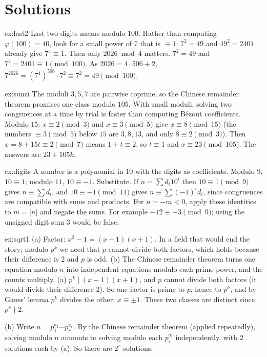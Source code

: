 \section{Solutions}

\begin{solution}{ex:last2}
\idea Last two digits means modulo $100$. Rather than computing $\varphi(100)=40$, look for a small power of $7$ that is $\equiv1$: $7^2=49$ and $49^2=2401$ already give $7^4\equiv1$. Then only $2026\bmod4$ matters.
\writeup $7^2=49$ and $7^4=2401\equiv1\pmod{100}$. As $2026=4\cdot506+2$, $7^{2026}=(7^4)^{506}\cdot7^2\equiv7^2=49\pmod{100}$.
\end{solution}

\begin{solution}{ex:sunzi}
\idea The moduli $3,5,7$ are pairwise coprime, so the Chinese remainder theorem promises one class modulo $105$. With small moduli, solving two congruences at a time by trial is faster than computing B\'ezout coefficients.
\writeup Modulo $15$: $x\equiv2\pmod3$ and $x\equiv3\pmod5$ give $x\equiv8\pmod{15}$ (the numbers $\equiv3\pmod5$ below $15$ are $3,8,13$, and only $8\equiv2\pmod3$). Then $x=8+15t\equiv2\pmod7$ means $1+t\equiv2$, so $t\equiv1$ and $x\equiv23\pmod{105}$. The answers are $23+105k$.
\end{solution}

\begin{solution}{ex:digits}
\idea A number is a polynomial in $10$ with the digits as coefficients. Modulo $9$, $10\equiv1$; modulo $11$, $10\equiv-1$. Substitute.
\writeup If $n=\sum d_i10^i$ then $10\equiv1\pmod9$ gives $n\equiv\sum d_i$, and $10\equiv-1\pmod{11}$ gives $n\equiv\sum(-1)^id_i$, since congruences are compatible with sums and products. For $n=-m<0$, apply these identities to $m=|n|$ and negate the sums. For example $-12\equiv-3\pmod9$; using the unsigned digit sum $3$ would be false.
\end{solution}

\begin{solution}{ex:sqrt1}
\idea (a) Factor: $x^2-1=(x-1)(x+1)$. In a field that would end the story; modulo $p^k$ we need that $p$ cannot divide both factors, which holds because their difference is $2$ and $p$ is odd. (b) The Chinese remainder theorem turns one equation modulo $n$ into independent equations modulo each prime power, and the counts multiply.
\writeup (a) $p^k\mid(x-1)(x+1)$, and $p$ cannot divide both factors (it would divide their difference $2$). So one factor is prime to $p$, hence to $p^k$, and by Gauss' lemma $p^k$ divides the other: $x\equiv\pm1$. These two classes are distinct since $p^k\nmid2$.

(b) Write $n=p_1^{a_1}\cdots p_r^{a_r}$. By the Chinese remainder theorem (applied repeatedly), solving modulo $n$ amounts to solving modulo each $p_i^{a_i}$ independently, with $2$ solutions each by (a). So there are $2^r$ solutions.
\end{solution}

